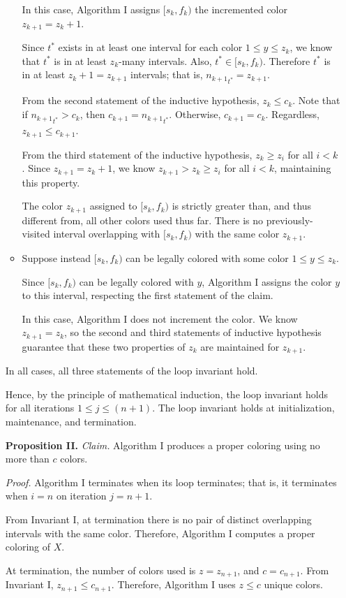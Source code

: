\begin{enumerate}
\begin{solution}
\begin{itemize}
In this case, Algorithm I assigns $[s_k,f_k)$ the incremented color $z_{k+1}=z_k+1$.

Since $t^*$ exists in at least one interval for each color $1\leq y\leq z_k$, we know that $t^*$ is in at least $z_k$-many intervals. Also, $t^*\in[s_k,f_k)$. Therefore $t^*$ is in at least $z_k+1=z_{k+1}$ intervals; that is, ${n_{k+1}}_{t^*}=z_{k+1}$.

From the second statement of the inductive hypothesis, $z_k\leq c_k$. Note that if ${n_{k+1}}_{t^*}>c_k$, then $c_{k+1}={n_{k+1}}_{t^*}$. Otherwise, $c_{k+1}=c_k$. Regardless, $z_{k+1}\leq c_{k+1}$.

From the third statement of the inductive hypothesis, $z_k\geq z_i$ for all $i<k$. Since $z_{k+1}=z_k+1$, we know $z_{k+1}>z_k\geq z_i$ for all $i<k$, maintaining this property.

The color $z_{k+1}$ assigned to $[s_k,f_k)$ is strictly greater than, and thus different from, all other colors used thus far. There is no previously-visited interval overlapping with $[s_k,f_k)$ with the same color $z_{k+1}$.
\item Suppose instead $[s_k,f_k)$ can be legally colored with some color $1\leq y\leq z_k$.

Since $[s_k,f_k)$ can be legally colored with $y$, Algorithm I assigns the color $y$ to this interval, respecting the first statement of the claim.

In this case, Algorithm I does not increment the color. We know $z_{k+1}=z_k$, so the second and third statements of inductive hypothesis guarantee that these two properties of $z_k$ are maintained for $z_{k+1}$.
\end{itemize}
In all cases, all three statements of the loop invariant hold.

Hence, by the principle of mathematical induction, the loop invariant holds for all iterations $1\leq j\leq(n+1)$. The loop invariant holds at initialization, maintenance, and termination.

\textbf{Proposition II. }
\textit{Claim. }Algorithm I produces a proper coloring using no more than $c$ colors.

\textit{Proof. }Algorithm I terminates when its loop terminates; that is, it terminates when $i=n$ on iteration $j=n+1$.

From Invariant I, at termination there is no pair of distinct overlapping intervals with the same color. Therefore, Algorithm I computes a proper coloring of $X$.

At termination, the number of colors used is $z=z_{n+1}$, and $c=c_{n+1}$. From Invariant I, $z_{n+1}\leq c_{n+1}$. Therefore, Algorithm I uses $z\leq c$ unique colors.


\end{solution}
\end{enumerate}
